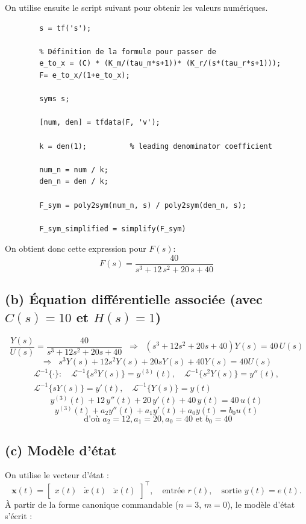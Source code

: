 \documentclass[12pt]{article}
\begin{document}
    On utilise ensuite le script suivant pour obtenir les valeurs numériques.
    \begin{lstlisting}[label={lst:lstlisting01}]
        % Définition de la variable dans le domaine de Laplace
        s = tf('s');

        % Définition de la formule pour passer de
        e_to_x = (C) * (K_m/(tau_m*s+1))* (K_r/(s*(tau_r*s+1)));
        F= e_to_x/(1+e_to_x);

        syms s;

        [num, den] = tfdata(F, 'v');

        k = den(1);          % leading denominator coefficient

        num_n = num / k;
        den_n = den / k;

        F_sym = poly2sym(num_n, s) / poly2sym(den_n, s);

        F_sym_simplified = simplify(F_sym)

    \end{lstlisting}

    On obtient donc cette expression pour $F(s)$:
    \[
        F(s) = \frac{40}{s^3+12\,s^2+20\,s+40}
    \]
    \subsection{(b) Équation différentielle associée (avec $C(s)=10$ et $H(s)=1$)}
    \[
        \frac{Y(s)}{U(s)}=\frac{40}{s^3+12s^2+20s+40}
        \;\;\Longrightarrow\;\;
        \left(s^3+12s^2+20s+40\right)Y(s)=40\,U(s)
    \]
    \[
        \Longrightarrow\;\;
        s^3Y(s)+12s^2Y(s)+20sY(s)+40Y(s)=40U(s)
    \]
    \begin{gather*}
        \mathcal{L}^{-1}\{\cdot\}:\quad
        \mathcal{L}^{-1}\{s^3Y(s)\}=y^{(3)}(t), \quad
        \mathcal{L}^{-1}\{s^2Y(s)\}=y''(t), \\
        \mathcal{L}^{-1}\{sY(s)\}=y'(t), \quad
        \mathcal{L}^{-1}\{Y(s)\}=y(t)
    \end{gather*}
    \[
        \boxed{
            y^{(3)}(t)+12\,y''(t)+20\,y'(t)+40\,y(t)=40\,u(t)
        }
    \]
    \[
        y^{(3)}(t) +  a_2 y''(t)+a_1 y'(t)+ a_0 y(t)=  b_0 u(t)
    \]
    \[
        \text{ d'où }  a_2=12, a_1=20, a_0=40 \text{ et } b_0 =40
    \]


    \subsection{(c) Modèle d'état}
    On utilise le vecteur d'état :
    \[
        \mathbf{x}(t) = \begin{bmatrix} x(t) & \dot{x}(t) & \ddot{x}(t) \end{bmatrix}^\top,
        \quad \text{entrée } r(t), \quad \text{sortie } y(t)=e(t).
    \]
    À partir de la forme canonique commandable (\(n=3,\, m=0\)), le modèle d'état s'écrit :
\end{document}
